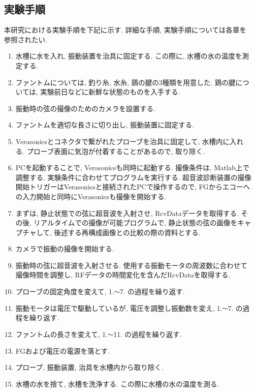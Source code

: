 \subsection{実験手順}
本研究における実験手順を下記に示す. 詳細な手順, 実験手順については各章を参照されたい. 
\begin{enumerate}
  \item 水槽に水を入れ, 振動装置を治具に固定する. この際に, 水槽の水の温度を測定する. 
  \item ファントムについては, 釣り糸, 水糸, 鶏の腱の3種類を用意した. 鶏の腱については, 実験前日などに新鮮な状態のものを入手する. 
  \item 振動時の弦の撮像のためのカメラを設置する. 
  \item ファントムを適切な長さに切り出し, 振動装置に固定する. 
  \item Verasonicsとコネクタで繋がれたプローブを治具に固定して, 水槽内に入れる. プローブ表面に気泡が付着することがあるので, 取り除く. 
  \item PCを起動することで, Verasonicsも同時に起動する. 撮像条件は, Matlab上で調整する. 実験条件に合わせてプログラムを実行する. 超音波診断装置の撮像開始トリガーはVerasonicsと接続されたPCで操作するので, FGからエコーへの入力開始と同時にVerasonicsも撮像を開始する.
   \item まずは, 静止状態での弦に超音波を入射させ, RcvDataデータを取得する. その後, リアルタイムでの撮像が可能プログラムで, 静止状態の弦の画像をキャプチャして, 後述する再構成画像との比較の際の資料とする. 
   \item カメラで振動の撮像を開始する. 
   \item 振動時の弦に超音波を入射させる. 使用する振動モータの周波数に合わせて撮像時間を調整し, RFデータの時間変化を含んだRcvDataを取得する. 
   \item プローブの固定角度を変えて, 1.\verb|〜|7. の過程を繰り返す.
   \item 振動モータは電圧で駆動しているが, 電圧を調整し振動数を変え, 1.\verb|〜|7. の過程を繰り返す.
   \item ファントムの長さを変えて, 1.\verb|〜|11. の過程を繰り返す.
   \item FGおよび電圧の電源を落とす. 
   \item プローブ, 振動装置, 治具を水槽内から取り除く. 
   \item 水槽の水を捨て, 水槽を洗浄する. この際に水槽の水の温度を測る.    
\end{enumerate}

